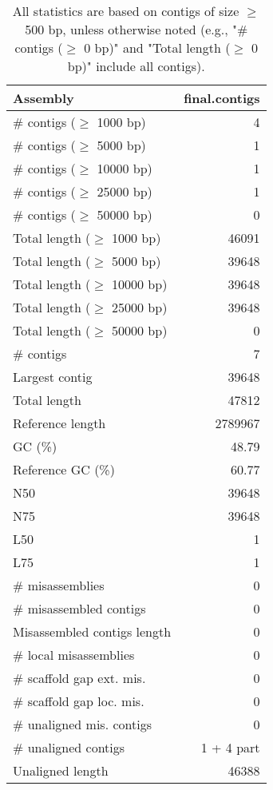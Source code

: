\documentclass[12pt,a4paper]{article}
\begin{document}
\begin{table}[ht]
\begin{center}
\caption{All statistics are based on contigs of size $\geq$ 500 bp, unless otherwise noted (e.g., "\# contigs ($\geq$ 0 bp)" and "Total length ($\geq$ 0 bp)" include all contigs).}
\begin{tabular}{|l*{1}{|r}|}
\hline
Assembly & final.contigs \\ \hline
\# contigs ($\geq$ 1000 bp) & 4 \\ \hline
\# contigs ($\geq$ 5000 bp) & 1 \\ \hline
\# contigs ($\geq$ 10000 bp) & 1 \\ \hline
\# contigs ($\geq$ 25000 bp) & 1 \\ \hline
\# contigs ($\geq$ 50000 bp) & 0 \\ \hline
Total length ($\geq$ 1000 bp) & 46091 \\ \hline
Total length ($\geq$ 5000 bp) & 39648 \\ \hline
Total length ($\geq$ 10000 bp) & 39648 \\ \hline
Total length ($\geq$ 25000 bp) & 39648 \\ \hline
Total length ($\geq$ 50000 bp) & 0 \\ \hline
\# contigs & 7 \\ \hline
Largest contig & 39648 \\ \hline
Total length & 47812 \\ \hline
Reference length & 2789967 \\ \hline
GC (\%) & 48.79 \\ \hline
Reference GC (\%) & 60.77 \\ \hline
N50 & 39648 \\ \hline
N75 & 39648 \\ \hline
L50 & 1 \\ \hline
L75 & 1 \\ \hline
\# misassemblies & 0 \\ \hline
\# misassembled contigs & 0 \\ \hline
Misassembled contigs length & 0 \\ \hline
\# local misassemblies & 0 \\ \hline
\# scaffold gap ext. mis. & 0 \\ \hline
\# scaffold gap loc. mis. & 0 \\ \hline
\# unaligned mis. contigs & 0 \\ \hline
\# unaligned contigs & 1 + 4 part \\ \hline
Unaligned length & 46388 \\ \hline

\end{tabular}
\end{center}
\end{table}
\end{document}
